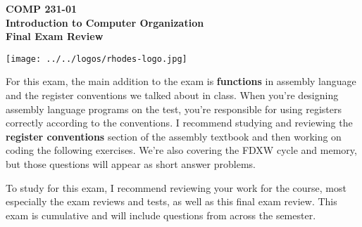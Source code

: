 \documentclass[10pt]{article}
\begin{document}

\hspace{-5mm}
\begin{minipage}{0.65\linewidth}
  \textbf{
      \hspace{-3mm}
      {\Large COMP 231-01}\\
      {\Large Introduction to Computer Organization}\\
      {\Large Final Exam Review}}
\end{minipage}
\begin{minipage}{0.35\linewidth}
  \texttt{[image: ../../logos/rhodes-logo.jpg]}
\end{minipage}




For this exam, the main addition to the exam is \textbf{functions} in assembly language and the register conventions we talked about in class.  When you're designing assembly language programs on the test, you're responsible for using registers correctly according to the conventions.  I recommend studying and reviewing the \textbf{register conventions} section of the assembly textbook and then working on coding the following exercises.  We're also covering the FDXW cycle and memory, but those questions will appear as short answer problems. 

To study for this exam, I recommend reviewing your work for the course, most especially the exam reviews and tests, as well as this final exam review.  This exam is cumulative and will include questions from across the semester. 
\end{document}
